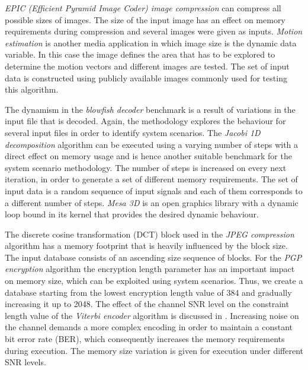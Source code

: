 \textit{EPIC (Efficient Pyramid Image Coder) image compression} can compress all possible sizes of images. 
The size of the input image has an effect on memory requirements during compression and several images were given as inputs. 
\textit{Motion estimation} is another media application in which image size is the dynamic data variable. 
In this case the image defines the area that has to be explored to determine the motion vectors and different images are tested. 
The set of input data is constructed using publicly available images commonly used for testing this algorithm.

The dynamism in the \textit{blowfish decoder} benchmark is a result of variations in the input file that is decoded. 
Again, the methodology explores the behaviour for several input files in order to identify system scenarios. 
The \textit{Jacobi 1D decomposition} algorithm can be executed using a varying number of steps with a direct effect on memory usage and is hence another suitable benchmark for the system scenario methodology. 
The number of steps is increased on every next iteration, in order to generate a set of different memory requirements. 
The set of input data is a random sequence of input signals and each of them corresponds to a different number of steps.
\textit{Mesa 3D} is an open graphics library with a dynamic loop bound in its kernel that provides the desired dynamic behaviour. 

The discrete cosine transformation (DCT) block used in the \textit{JPEG compression} algorithm has a memory footprint that is heavily influenced by the block size. 
The input database consists of an ascending size sequence of blocks. 
For the \textit{PGP encryption} algorithm the encryption length parameter has an important impact on memory size, which can be exploited using system scenarios. 
Thus, we create a database starting from the lowest encryption length value of 384 and gradually increasing it up to 2048. 
The effect of the channel SNR level on the constraint length value of the \textit{Viterbi encoder} algorithm is discussed in \cite{Fil12}. 
Increasing noise on the channel demands a more complex encoding in order to maintain a constant bit error rate (BER), which consequently increases the memory requirements during execution. 
The memory size variation is given for execution under different SNR levels.  

